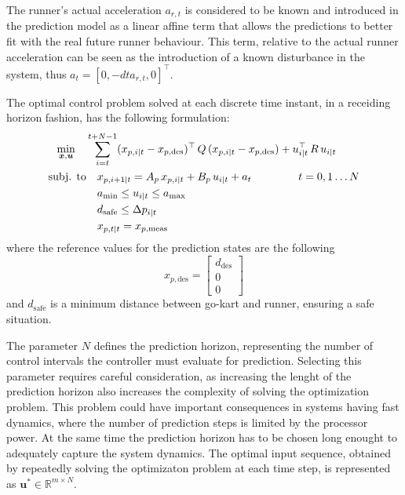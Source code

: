 \documentclass[a4paper,12pt,oneside]{book}
\begin{document}
The runner's actual acceleration $a_{r,t}$ is considered to be known and introduced in the prediction model as a linear affine term that allows the predictions to better fit with the real future runner behaviour.
This term, relative to the actual runner acceleration can be seen as the introduction of a known disturbance in the system, thus $a_t = [0, -dt a_{r,t}, 0]^\top$.

\bigskip
The optimal control problem solved at each discrete time instant, in a receiding horizon fashion, has the following formulation:
\begin{equation}
\begin{alignedat}{2}
	\min_{\substack{\boldsymbol{x}, \boldsymbol{u}}}\quad &\sum_{i=t}^{t+N-1} (x_{p,i|t} - x_{p,\text{des}}) ^\top \, Q \, (x_{p,i|t} - x_{p,\text{des}}) +  u_{i|t}^\top \, R \, u_{i|t} &&   \\
	\text{subj. to} & \quad x_{p,i+1|t}  = A_p \, x_{p,i|t} + B_p \, u_{i|t} + a_t  \hspace{1.5cm} t = 0, 1 \ldots N && \\
    &\quad a_{\text{min}} \leq u_{i|t} \leq a_{\text{max}}&& \\
    &\quad d_{\text{safe}}\leq \Delta p_{i|t} &&  \\
    &\quad x_{p,t|t} = x_{p,\text{meas}} &&
\end{alignedat}
\label{MPC_formulation}
\end{equation}
where the reference values for the prediction states are the following
\begin{equation}
    x_{p,\text{des}} =
    \begin{bmatrix}
        d_{\text{des}}  \\
        0 \\
        0
    \end{bmatrix}
\end{equation}
and $d_{\text{safe}}$ is a minimum distance between go-kart and runner, ensuring a safe situation.

\bigskip
The parameter $N$ defines the prediction horizon, representing the number of control intervals the controller must evaluate for prediction. 
Selecting this parameter requires careful consideration, as increasing the lenght of the prediction horizon also increases the complexity of solving the optimization problem.
This problem could have important consequences in systems having fast dynamics, where the number of prediction steps is limited by the processor power.
At the same time the prediction horizon has to be chosen long enought to adequately capture the system dynamics.
The optimal input sequence, obtained by repeatedly solving the optimizaton problem at each time step, is represented as $\boldsymbol{u}^* \in \mathbb{R}^{m \times N}$.
\end{document}
